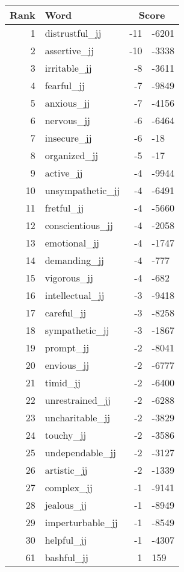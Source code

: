 \begin{longtable}[!htbp]{| rlr@{.}l |}
    \hline
    \textbf{Rank} & \textbf{Word} & \multicolumn{2}{c|}{\textbf{Score}} \\
    \hline
    \endhead
    1 & distrustful\_jj & -11 & -6201 \\
    2 & assertive\_jj & -10 & -3338 \\
    3 & irritable\_jj & -8 & -3611 \\
    4 & fearful\_jj & -7 & -9849 \\
    5 & anxious\_jj & -7 & -4156 \\
    6 & nervous\_jj & -6 & -6464 \\
    7 & insecure\_jj & -6 & -18 \\
    8 & organized\_jj & -5 & -17 \\
    9 & active\_jj & -4 & -9944 \\
    10 & unsympathetic\_jj & -4 & -6491 \\
    11 & fretful\_jj & -4 & -5660 \\
    12 & conscientious\_jj & -4 & -2058 \\
    13 & emotional\_jj & -4 & -1747 \\
    14 & demanding\_jj & -4 & -777 \\
    15 & vigorous\_jj & -4 & -682 \\
    16 & intellectual\_jj & -3 & -9418 \\
    17 & careful\_jj & -3 & -8258 \\
    18 & sympathetic\_jj & -3 & -1867 \\
    19 & prompt\_jj & -2 & -8041 \\
    20 & envious\_jj & -2 & -6777 \\
    21 & timid\_jj & -2 & -6400 \\
    22 & unrestrained\_jj & -2 & -6288 \\
    23 & uncharitable\_jj & -2 & -3829 \\
    24 & touchy\_jj & -2 & -3586 \\
    25 & undependable\_jj & -2 & -3127 \\
    26 & artistic\_jj & -2 & -1339 \\
    27 & complex\_jj & -1 & -9141 \\
    28 & jealous\_jj & -1 & -8949 \\
    29 & imperturbable\_jj & -1 & -8549 \\
    30 & helpful\_jj & -1 & -4307 \\
    61 & bashful\_jj & 1 & 159 \\

\end{longtable}
